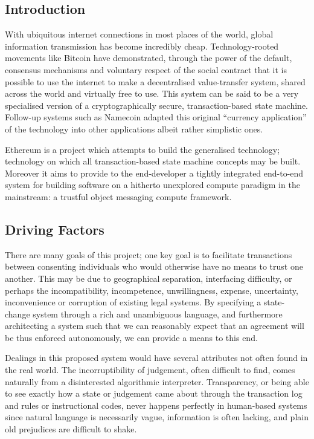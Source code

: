 \documentclass[9pt,oneside]{amsart}
\begin{document}
\setlength{\columnsep}{20pt}
\begin{multicols}{2}

\section{Introduction}\label{sec:introduction}

With ubiquitous internet connections in most places of the world, global information transmission has become incredibly cheap. Technology-rooted movements like Bitcoin have demonstrated, through the power of the default, consensus mechanisms and voluntary respect of the social contract that it is possible to use the internet to make a decentralised value-transfer system, shared across the world and virtually free to use. This system can be said to be a very specialised version of a cryptographically secure, transaction-based state machine. Follow-up systems such as Namecoin adapted this original ``currency application'' of the technology into other applications albeit rather simplistic ones.

Ethereum is a project which attempts to build the generalised technology; technology on which all transaction-based state machine concepts may be built. Moreover it aims to provide to the end-developer a tightly integrated end-to-end system for building software on a hitherto unexplored compute paradigm in the mainstream: a trustful object messaging compute framework.

\subsection{Driving Factors} \label{ch:driving}

There are many goals of this project; one key goal is to facilitate transactions between consenting individuals who would otherwise have no means to trust one another. This may be due to geographical separation, interfacing difficulty, or perhaps the incompatibility, incompetence, unwillingness, expense, uncertainty, inconvenience or corruption of existing legal systems. By specifying a state-change system through a rich and unambiguous language, and furthermore architecting a system such that we can reasonably expect that an agreement will be thus enforced autonomously, we can provide a means to this end.

Dealings in this proposed system would have several attributes not often found in the real world. The incorruptibility of judgement, often difficult to find, comes naturally from a disinterested algorithmic interpreter. Transparency, or being able to see exactly how a state or judgement came about through the transaction log and rules or instructional codes, never happens perfectly in human-based systems since natural language is necessarily vague, information is often lacking, and plain old prejudices are difficult to shake.


\end{multicols}
\end{document}
